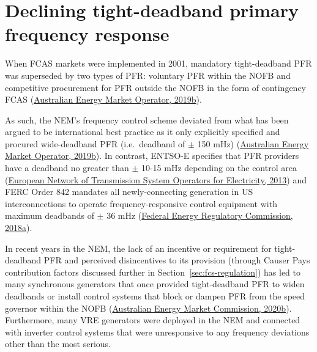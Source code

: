 \documentclass[12pt,a4paper,]{report}
\begin{document}
\hypertarget{sec:fcs-pfr}{%
\section{Declining tight-deadband primary frequency
response}\label{sec:fcs-pfr}}

When FCAS markets were implemented in 2001, mandatory tight-deadband PFR
was superseded by two types of PFR: voluntary PFR within the NOFB and
competitive procurement for PFR outside the NOFB in the form of
contingency FCAS
(\protect\hyperlink{ref-australianenergymarketoperatorElectricityRuleChange2019}{Australian
Energy Market Operator, 2019b}).

As such, the NEM's frequency control scheme deviated from what has been
argued to be international best practice as it only explicitly specified
and procured wide-deadband PFR (i.e.~deadband of \(\pm\) 150 mHz)
(\protect\hyperlink{ref-australianenergymarketoperatorElectricityRuleChange2019}{Australian
Energy Market Operator, 2019b}). In contrast, ENTSO-E specifies that PFR
providers have a deadband no greater than \(\pm\) 10-15 mHz depending on
the control area
(\protect\hyperlink{ref-europeannetworkoftransmissionsystemoperatorsforelectricityentso-eNetworkCodeLoadFrequency2013}{European
Network of Transmission System Operators for Electricity, 2013}) and
FERC Order 842 mandates all newly-connecting generation in US
interconnections to operate frequency-responsive control equipment with
maximum deadbands of \(\pm\) 36 mHz
(\protect\hyperlink{ref-federalenergyregulatorycommissionfercOrderNo8422018}{Federal
Energy Regulatory Commission, 2018a}).

In recent years in the NEM, the lack of an incentive or requirement for
tight-deadband PFR and perceived disincentives to its provision (through
Causer Pays contribution factors discussed further in
Section~\ref{sec:fcs-regulation}) has led to many synchronous generators
that once provided tight-deadband PFR to widen deadbands or install
control systems that block or dampen PFR from the speed governor within
the NOFB
(\protect\hyperlink{ref-australianenergymarketcommissionMandatoryPrimaryFrequency2020}{Australian
Energy Market Commission, 2020b}). Furthermore, many VRE generators were
deployed in the NEM and connected with inverter control systems that
were unresponsive to any frequency deviations other than the most
serious.
\end{document}
